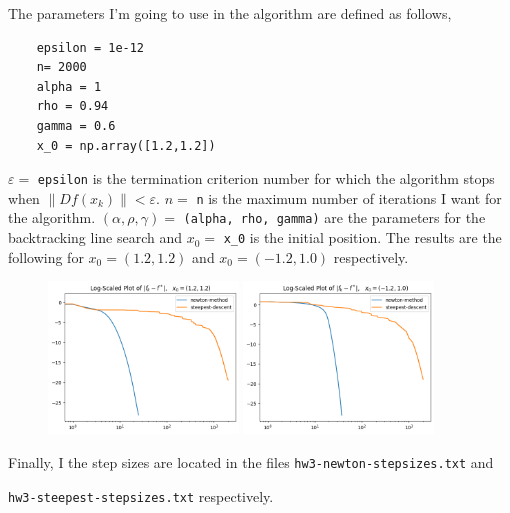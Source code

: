 The parameters I'm going to use in the algorithm are defined as follows,
\begin{verbatim}
    epsilon = 1e-12
    n= 2000
    alpha = 1
    rho = 0.94
    gamma = 0.6
    x_0 = np.array([1.2,1.2])
\end{verbatim}
$\varepsilon =$ \texttt{epsilon} is the termination criterion number for which the algorithm stops when $\|Df(x_k)\| < \varepsilon$. $n =$ \texttt{n} is the maximum number of iterations I want for the algorithm. $(\alpha, \rho, \gamma) =$ \texttt{(alpha, rho, gamma)} are the parameters for the backtracking line search and $x_0 = $ \texttt{x_0} is the initial position. The results are the following for $x_0 = (1.2,1.2)$ and $x_0 = (-1.2, 1.0)$ respectively.
\begin{figure}[h]
    \centering
    \includegraphics[width=0.45\textwidth]{../pictures/hw2ex3.1.png}
    \hfill
    \includegraphics[width=0.45\textwidth]{../pictures/hw2ex3.2.png}
\end{figure}

Finally, I the step sizes are located in the files \texttt{hw3-newton-stepsizes.txt} and 

\texttt{hw3-steepest-stepsizes.txt} respectively.
